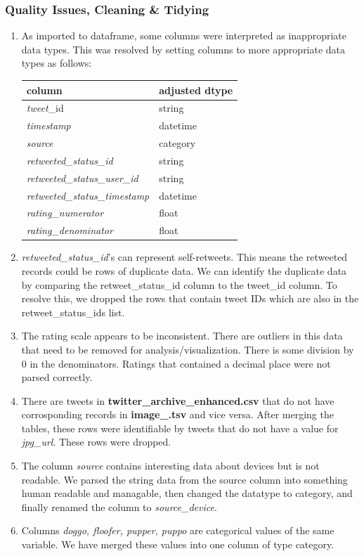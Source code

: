 \documentclass[10pt,a4paper]{report}
\begin{document}
		\subsubsection{Quality Issues, Cleaning \& Tidying}
			\begin{enumerate}
				\item As imported to dataframe, some columns were interpreted as inappropriate data types. This was resolved by setting 
				columns to more appropriate data types as follows:\\
					\begin{tabular}{ll}
						\toprule
						\textbf{column} & \textbf{adjusted dtype} \\
						\midrule
						\textit{tweet}\_id & string \\
						\textit{timestamp} & datetime \\
						\textit{source} & category \\
						\textit{retweeted\_status\_id} & string \\ 
						\textit{retweeted\_status\_user\_id} & string \\ 
						\textit{retweeted\_status\_timestamp} & datetime \\  
						\textit{rating\_numerator} & float \\
						\textit{rating\_denominator} & float \\

					\end{tabular}
				\item \textit{retweeted\_status\_id}'s can represent self-retweets. This means the retweeted records could be
					rows of duplicate data. We can identify the duplicate data by comparing the retweet\_status\_id column to the tweet\_id column. 
					To resolve this, we dropped the rows that contain tweet IDs which are also in the retweet\_status\_ids list.
				\item The rating scale appears to be inconsistent. There are outliers in this data that need 
					to be removed for analysis/visualization. There is some division by 0 in the denominators. Ratings that contained
					a decimal place were not parsed correctly.
				\item There are tweets in \textbf{twitter\_archive\_enhanced.csv} that do not have corrosponding records in \textbf{image\_.tsv} and vice versa.
					After merging the tables, these rows were identifiable by tweets that do not have a value for \textit{jpg\_url}. These rows were dropped.
				\item The column \textit{source} contains interesting data about devices but is not readable. We parsed the string data from the source column into
					something human readable and managable, then changed the datatype to category, and finally renamed the column to \textit{source\_device}.
				\item Columns \textit{doggo, floofer, pupper, puppo} are categorical values of the same variable. We have merged these values into one column of type category. 
			\end{enumerate} 
\end{document}

